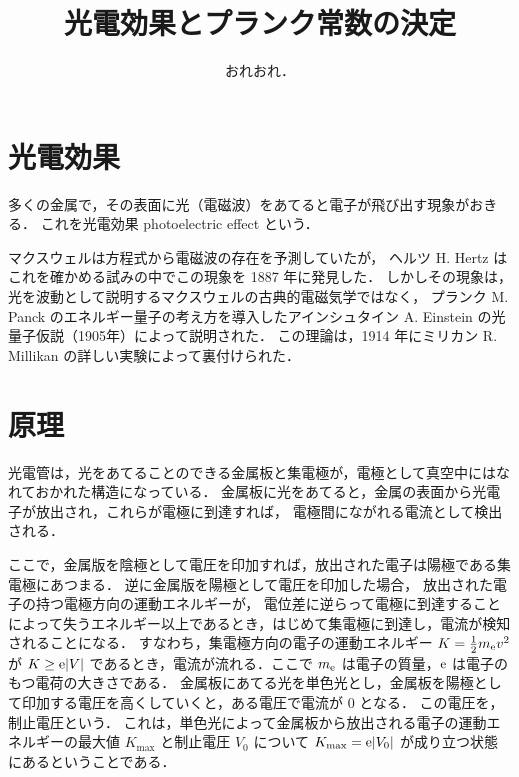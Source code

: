 \documentclass[11pt,a4,epsf]{jarticle}
\title{光電効果とプランク常数の決定}
\author{おれおれ．}
\date{}
\begin{document}
\maketitle

\section{光電効果}

多くの金属で，その表面に光（電磁波）をあてると電子が飛び出す現象がおきる．
これを光電効果 photoelectric effect という．

マクスウェルは方程式から電磁波の存在を予測していたが，
ヘルツ H. Hertz はこれを確かめる試みの中でこの現象を 1887 年に発見した．
しかしその現象は，光を波動として説明するマクスウェルの古典的電磁気学ではなく，
プランク M. Panck のエネルギー量子の考え方を導入したアインシュタイン A. Einstein の光量子仮説（1905年）によって説明された．
この理論は，1914 年にミリカン R. Millikan の詳しい実験によって裏付けられた．

\section{原理}

光電管は，光をあてることのできる金属板と集電極が，電極として真空中にはなれておかれた構造になっている．
金属板に光をあてると，金属の表面から光電子が放出され，これらが電極に到達すれば，
電極間にながれる電流として検出される．

ここで，金属版を陰極として電圧を印加すれば，放出された電子は陽極である集電極にあつまる．
逆に金属版を陽極として電圧を印加した場合，
放出された電子の持つ電極方向の運動エネルギーが，
電位差に逆らって電極に到達することによって失うエネルギー以上であるとき，はじめて集電極に到達し，電流が検知されることになる．
すなわち，集電極方向の電子の運動エネルギー $K = \frac{1}{2}m_{\rm e} v^2$ が $K \geq {\rm e}|V|$ であるとき，電流が流れる．ここで $m_{\rm e}$ は電子の質量，${\rm e}$ は電子のもつ電荷の大きさである．
金属板にあてる光を単色光とし，金属板を陽極として印加する電圧を高くしていくと，ある電圧で電流が 0 となる．
この電圧を，制止電圧という．
これは，単色光によって金属板から放出される電子の運動エネルギーの最大値 $K_{\max}$ と制止電圧 $V_0$ について $K_{\max} = {\rm e}|V_0|$ が成り立つ状態にあるということである．
\end{document}
